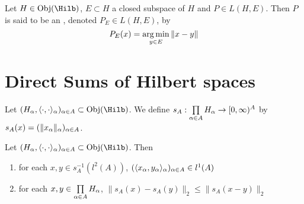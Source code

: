 \documentclass{book}
\begin{document}
\begin{defn}
	Let $H \in \Obj(\Hilb)$, $E \subset H$ a closed subspace of $H$ and $P \in L(H, E)$. Then $P$ is said to be an , denoted $P_E \in L(H, E)$, by 
	$$P_E(x) = \operatorname*{arg\,min}_{y \in E} \|x - y\|$$
\end{defn}










































\newpage
\section{Direct Sums of Hilbert spaces}

\begin{defn}
	Let $(H_\al, \l\cdot, \cdot \r_{\al})_{\al \in A} \subset \Obj(\Hilb)$. We define $s_A:\prod\limits_{\alpha \in A} H_{\alpha} \rightarrow [0,\infty)^A$ by $s_A(x) = (\|x_{\alpha}\|_{\alpha})_{\alpha \in A}$.
\end{defn}

\begin{ex}	
	Let $(H_\al, \l\cdot, \cdot \r_{\al})_{\al \in A} \subset \Obj(\Hilb)$. Then  
	\begin{enumerate}
		\item for each $x,y \in s_A^{-1}(l^2(A))$, $(\langle x_{\alpha}, y_{\alpha} \rangle_{\alpha})_{\alpha \in A} \in l^1(A)$
		\item for each $x,y \in \prod\limits_{\alpha \in A} H_{\alpha}$, $\|s_A(x) - s_A(y)\|_2 \leq \|s_A(x - y)\|_2$
	\end{enumerate}
		\item 
\end{ex}
\end{document}

